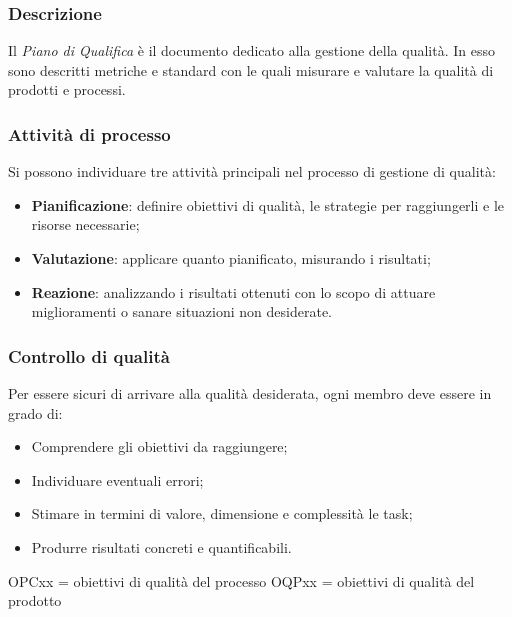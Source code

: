 \subsubsection{Descrizione}
Il \textit{Piano di Qualifica} è il documento dedicato alla gestione della qualità. In esso sono descritti metriche e standard con le quali misurare e valutare la qualità di prodotti e processi.  

\subsubsection{Attività di processo}
Si possono individuare tre attività principali nel processo di gestione di qualità:
\begin{itemize}
\item \textbf{Pianificazione}: definire obiettivi di qualità, le strategie per raggiungerli e le risorse necessarie; 
\item \textbf{Valutazione}: applicare quanto pianificato, misurando i risultati;
\item \textbf{Reazione}: analizzando i risultati ottenuti con lo scopo di attuare miglioramenti o sanare situazioni non desiderate.
\end{itemize}

\subsubsection{Controllo di qualità}
Per essere sicuri di arrivare alla qualità desiderata, ogni membro deve essere in grado di:
\begin{itemize}
\item Comprendere gli obiettivi da raggiungere;
\item Individuare eventuali errori;
\item Stimare in termini di valore, dimensione e complessità le task;
\item Produrre risultati concreti e quantificabili.
\end{itemize}

OPCxx = obiettivi di qualità del processo
OQPxx = obiettivi di qualità del prodotto


